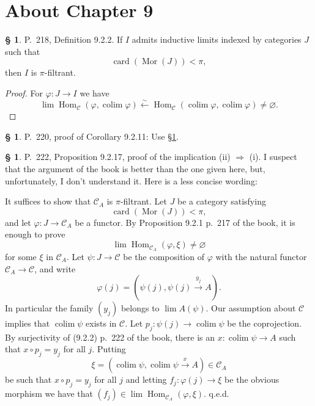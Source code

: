 \documentclass[12pt]{article}
\theoremstyle{remark}
\theoremstyle{definition}
\newtheorem{s}[thm]{\S}
\newcommand{\C}{\mathcal C}
\newcommand{\pp}{\varphi}
\newcommand{\then}{\Rightarrow}
\newcommand{\xr}{\xrightarrow}
\DeclareMathOperator*{\co}{colim}
\DeclareMathOperator{\card}{card}%
\DeclareMathOperator{\Hom}{Hom}%
\DeclareMathOperator{\Mor}{Mor}
\begin{document}
\section{About Chapter 9}
%
%
\begin{s}\label{922}
P.~218, Definition 9.2.2. If $I$ admits inductive limits indexed by categories $J$ such that 
$$
\operatorname{card}(\Mor(J))<\pi,
$$ 
then $I$ is $\pi$-filtrant.

\begin{proof}
For $\varphi:J\to I$ we have
$$
\lim\Hom_\C(\varphi,\co\varphi)\xleftarrow\sim\Hom_\C(\co\varphi,\co\varphi)\neq\varnothing.
$$
\end{proof}
\end{s}
%
%
\begin{s} 
P.~220, proof of Corollary 9.2.11: Use \S\ref{922}.
\end{s}
%
%
\begin{s} 
P.~222, Proposition 9.2.17, proof of the implication (ii) $\then$ (i). I suspect that the argument of the book is better than the one given here, but, unfortunately, I don't understand it. Here is a less concise wording:

It suffices to show that $\C_A$ is $\pi$-filtrant. Let $J$ be a category satisfying 
$$
\card(\Mor(J))<\pi,
$$ 
and let $\pp:J\to\C_A$ be a functor. By Proposition 9.2.1 p.~217 of the book, it is enough to prove 
$$
\lim\Hom_{\C_A}(\pp,\xi)\neq\varnothing
$$ 
for some $\xi$ in $\C_A$. Let $\psi:J\to\C$ be the composition of $\varphi$ with the natural functor $\C_A\to\C$, and write 
$$
\varphi(j)=(\psi(j),\psi(j)\xr{y_j}A).
$$ 
In particular the family $(y_j)$ belongs to $\lim A(\psi)$. Our assumption about $\C$ implies that $\co\psi$ exists in $\C$. Let $p_j:\psi(j)\to\co\psi$ be the coprojection. By surjectivity of (9.2.2) p.~222 of the book, there is an $x:\co\psi\to A$ such that $x\circ p_j=y_j$ for all $j$. Putting 
$$
\xi=(\co\psi,\co\psi\xr x A)\in\C_A
$$ 
be such that $x\circ p_j=y_j$ for all $j$ and letting $f_j:\varphi(j)\to\xi$ be the obvious morphism we have that $(f_j)\in\lim\Hom_{\C_A}(\varphi,\xi)$. q.e.d.
\end{s}
%
%
\end{document}
